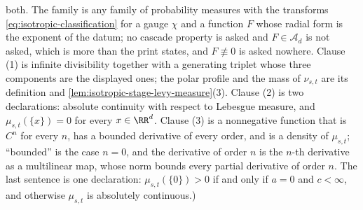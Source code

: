 \begin{proposition}
{both. The family is any family of probability measures with the transforms
\ref{eq:isotropic-classification} for a gauge $\chi$ and a function $F$ whose radial form is the
exponent of the datum; no cascade property is asked and $F \in \mathcal{A}_d$ is not asked, which
is more than the print states, and $F \not\equiv 0$ is asked nowhere. Clause
(1) is infinite
divisibility together with a generating triplet whose three components are the displayed ones;
the polar profile and the mass of $\nu_{s,t}$ are its definition and
\ref{lem:isotropic-stage-levy-measure}(3). Clause (2) is two declarations: absolute continuity
with respect to Lebesgue measure, and $\mu_{s,t}(\{x\}) = 0$ for every $x \in \RR^d$. Clause (3)
is a nonnegative
function that is $C^n$ for every $n$, has a bounded derivative of every order, and is a density
of $\mu_{s,t}$; ``bounded'' is the case $n = 0$, and the derivative of order $n$ is the
$n$-th derivative as a multilinear map, whose norm bounds every partial derivative of order
$n$. The last
sentence is one declaration: $\mu_{s,t}(\{0\}) > 0$ if and only if $a = 0$ and $c < \infty$, and
otherwise $\mu_{s,t}$ is absolutely continuous.)}
\end{proposition}

